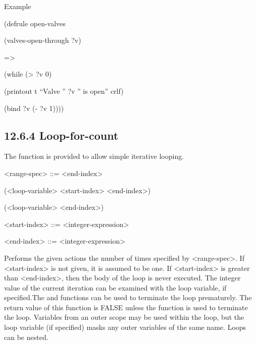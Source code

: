 \documentclass[letterpaper,10pt,english]{sphinxmanual}
\begin{document}
Example

\begin{DUlineblock}{0em}
\item[] (defrule open-valves
\item[] (valves-open-through ?v)
\item[] =\textgreater{}
\item[] (while (\textgreater{} ?v 0)
\end{DUlineblock}

\begin{DUlineblock}{0em}
\item[] (printout t “Valve ” ?v ” is open” crlf)
\item[] (bind ?v (- ?v 1))))
\end{DUlineblock}


\subsection{12.6.4 Loop-for-count}
\label{\detokenize{actions:loop-for-count}}
The  function is provided to allow simple iterative
looping.


\begin{sphinxVerbatim}[commandchars=\\\{\}]
  \PYG{p}{[}\PYG{p}{]} 
\end{sphinxVerbatim}

\textless{}range-spec\textgreater{} ::= \textless{}end-index\textgreater{} \textbar{}

(\textless{}loop-variable\textgreater{} \textless{}start-index\textgreater{} \textless{}end-index\textgreater{}) \textbar{}

(\textless{}loop-variable\textgreater{} \textless{}end-index\textgreater{})

\textless{}start-index\textgreater{} ::= \textless{}integer-expression\textgreater{}

\textless{}end-index\textgreater{} ::= \textless{}integer-expression\textgreater{}

Performs the given actions the number of times specified by
\textless{}range-spec\textgreater{}. If \textless{}start-index\textgreater{} is not given, it is assumed to be one. If
\textless{}start-index\textgreater{} is greater than \textless{}end-index\textgreater{}, then the body of the loop is
never executed. The integer value of the current iteration can be
examined with the loop variable, if specified.The  and
 functions can be used to terminate the loop prematurely. The
return value of this function is FALSE unless the  function is
used to terminate the loop. Variables from an outer scope may be used
within the loop, but the loop variable (if specified) masks any outer
variables of the same name. Loops can be nested.
\end{document}
